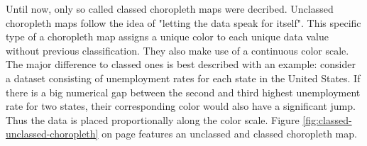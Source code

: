 Until now, only so called classed choropleth maps were decribed. Unclassed choropleth maps follow the idea of "letting the data speak for itself". This specific type of a choropleth map assigns a unique color to each unique data value without previous classification. They also make use of a continuous color scale. The major difference to classed ones is best described with an example: consider a dataset consisting of unemployment rates for each state in the United States. If there is a big numerical gap between the second and third highest unemployment rate for two states, their corresponding color would also have a significant jump. Thus the data is placed proportionally along the color scale. Figure \ref{fig:classed-unclassed-choropleth} on page \pageref{fig:classed-unclassed-choropleth} features an unclassed and classed choropleth map.

